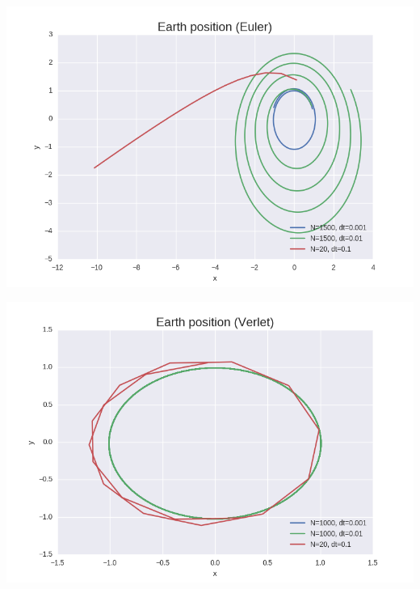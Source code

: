 \documentclass[11pt]{article}
\begin{document}
\begin{flushleft}
\begin{flushleft}
\begin{center}
\includegraphics[scale=0.5]{Euler_stability_dt.png}
\end{center}

\begin{center}
\includegraphics[scale=0.5]{Verlet_stability_dt.png}
\end{center}
\end{flushleft}












\end{flushleft}
\end{document}
